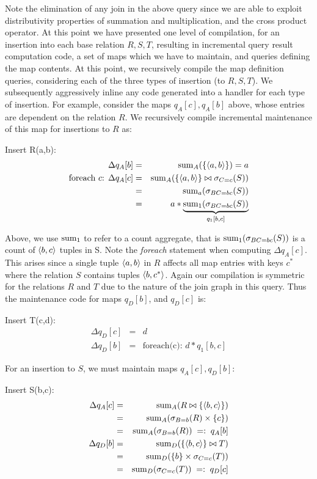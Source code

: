 Note the elimination of any join in the above query since we are able to exploit
distributivity properties of summation and multiplication, and the cross product
operator. At this point we have presented one level of compilation, for an
insertion into each base relation $R, S, T$, resulting in incremental query
result computation code, a set of maps which we have to maintain, and queries
defining the map contents. At this point, we recursively compile the map
definition queries, considering each of the three types of insertion (to
$R,S,T$). We subsequently aggressively inline any code generated into a handler
for each type of insertion. For example, consider the maps $q_A[c], q_A[b]$
above, whose entries are dependent on the relation $R$. We recursively compile
incremental maintenance of this map for insertions to $R$ as:

\smallskip
Insert R(a,b):
\begin{eqnarray*}
\Delta q_A[b] &=& \mathrm{sum}_{A}(\{{\langle a,b\rangle}\}) = a
\\
\mbox{foreach $c$: }
\Delta q_A[c] &=& \mathrm{sum}_{A}(\{{\langle a,b\rangle}\} \bowtie \sigma_{C=c}(S))
\\ &=&
\mathrm{sum}_{a}(\sigma_{BC=bc}(S))
\\ &=&
a * \underbrace{\mathrm{sum}_{1}(\sigma_{BC=bc}(S))}_{q_1[b,c]}
\end{eqnarray*}

Above, we use $\mathrm{sum}_{1}$ to refer to a count aggregate, that is 
$\mathrm{sum}_{1}(\sigma_{BC=bc}(S))$ is a count of ${\langle b,c\rangle}$ tuples in S.
Note the \textit{foreach} statement when computing $\Delta q_A[c]$. This arises
since a single tuple ${\langle a,b\rangle}$ in $R$ affects all map entries with keys
$c^*$ where the relation $S$ contains tuples ${\langle b,c^*\rangle}$. Again our
compilation is symmetric for the relations $R$ and $T$ due to the nature of the
join graph in this query. Thus the maintenance code for maps $q_D[b]$, and 
$q_D[c]$ is:

\smallskip
Insert T(c,d):
\begin{eqnarray*}
\Delta q_D[c] &=& d\\
\Delta q_D[b] &=& \mbox{foreach(c): } d * q_1[b,c]
\end{eqnarray*}

\noindent For an insertion to $S$, we must maintain maps $q_A[c], q_D[b]$:

\smallskip
Insert S(b,c):
\begin{eqnarray*}
\Delta q_A[c] &=&
\mathrm{sum}_{A}(R \bowtie \{{\langle b,c\rangle}\})
\\ &=&
\mathrm{sum}_{A}(\sigma_{B=b}(R) \times \{c\})
\\ &=&
\mathrm{sum}_{A}(\sigma_{B=b}(R))
\;=:\; q_A[b]
\\
\Delta q_D[b] &=&
\mathrm{sum}_{D}(\{{\langle b,c\rangle}\} \bowtie T)
\\ &=&
\mathrm{sum}_{D}(\{b\} \times \sigma_{C=c}(T))
\\ &=&
\mathrm{sum}_{D}(\sigma_{C=c}(T))
\;=:\; q_D[c]
\end{eqnarray*}

